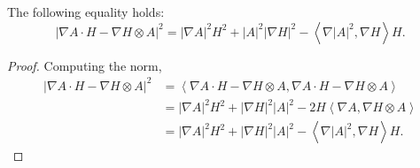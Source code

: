 \begin{comment}
\begin{lemma}
    \begin{equation}
        | H \cdot\nabla_{i} h_{kl}  - \nabla_{i}H\cdot h_{kl}|^{2} = H^{2}| \nabla A|^{2}+ |A|^{2}| \nabla H|^{2}   - \left<  \nabla_{i}|A|^{2}, \nabla_{i}H \right>H
    \end{equation}
\end{lemma}
\begin{proof}
    \begin{align*}
        \left< H \cdot\nabla_{i} h_{kl}  - \nabla_{i}H\cdot h_{kl}, H \cdot\nabla_{i} h_{kl}  - \nabla_{i}H\cdot h_{kl} \right> & = H^{2}| \nabla A|^{2} + 
    \end{align*}
\end{proof} 
\end{comment}

\begin{lemma}
    The following equality holds: 
    \begin{equation}
        |\nabla A \cdot H - \nabla H \otimes A|^{2} = | \nabla A|^{2}H^{2} + |A|^{2}| \nabla H|^{2} - \left<  \nabla |A|^{2}, \nabla H \right>H.
    \end{equation}
\end{lemma}
\begin{proof}
    Computing the norm, 
    \begin{align*}
        |\nabla A \cdot H - \nabla H \otimes A|^{2} & = \left<  \nabla A \cdot H - \nabla H \otimes A, \nabla A \cdot H - \nabla H \otimes A  \right> \\
        & = |\nabla A|^{2}H^{2} + |\nabla H|^{2}|A|^{2} - 2H\left< \nabla A, \nabla H \otimes A \right> \\
        & = |\nabla A|^{2}H^{2} + |\nabla H|^{2}|A|^{2} - \left< \nabla |A|^{2}, \nabla H \right>H.
    \end{align*}
\end{proof}



